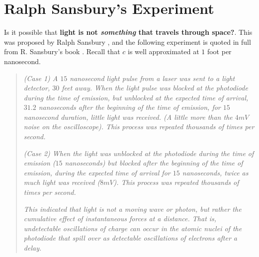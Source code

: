 \documentclass[12pt]{amsart}
\begin{document}




\section{Ralph Sansbury's Experiment}\label{sansbury}

Is it possible that \textbf{light is not \emph{something} that travels through space?}. This was proposed by Ralph Sansbury \cite{sansburylight}, and the following experiment is quoted in full from R. Sansbury's book \cite{sansburyspeed}. Recall that $c$ is well approximated at $1$ foot per nanosecond.

\begin{quote}
\emph{ (Case 1) A $15$ nanosecond light pulse from a laser was sent to a light detector, $30$ feet away. When the light pulse was blocked at the photodiode during the time of emission, but unblocked at the expected time of arrival, $31.2$ nanoseconds after the beginning of the time of emission, for $15$ nanosecond duration, little light was received. (A little more than the $4mV$ noise on the oscilloscope). This process was repeated thousands of times per second.}

\emph{(Case 2) When the light was unblocked at the photodiode during the time of emission ($15$ nanoseconds) but blocked after the beginning of the time of emission, during the expected time of arrival for $15$ nanoseconds, twice as much light was received ($8mV$). This process was repeated thousands of times per second.}

\emph{This indicated that light is not a moving wave or photon, but rather the cumulative effect of instantaneous forces at a distance. That is, undetectable oscillations of charge can occur in the atomic nuclei of the photodiode that spill over as detectable oscillations of electrons after a delay.}
\end{quote}
\end{document}
